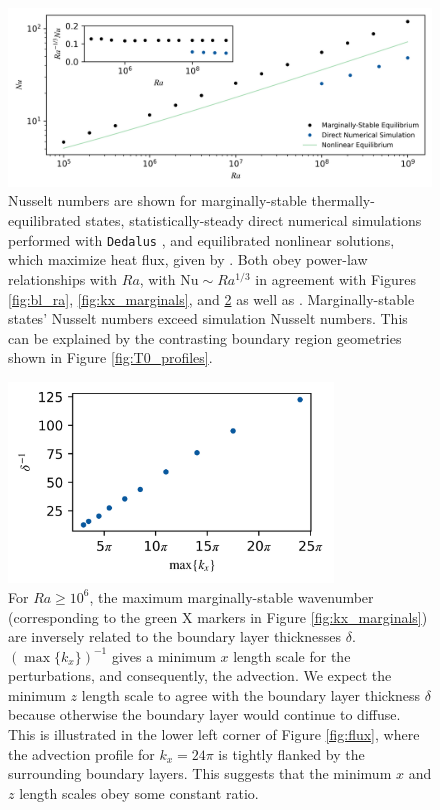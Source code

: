 \documentclass[reprint,amsmath,amssymb,aps]{revtex4-1}
\newcommand\Nu{\mathrm{Nu}}
\begin{document}
\begin{figure}
    \centering
    \includegraphics[width=7.1in]{nu_ra.PNG}
    \caption{Nusselt numbers are shown for marginally-stable thermally-equilibrated states, statistically-steady direct numerical simulations performed with \texttt{Dedalus} \cite{Anders_cd}, and equilibrated nonlinear solutions, which maximize heat flux, given by \cite{Waleffe}. 
    Both obey power-law relationships with $Ra$, with $\Nu \sim Ra^{1/3}$ in agreement with Figures \ref{fig:bl_ra}, \ref{fig:kx_marginals}, and \ref{fig:del_inv} as well as \cite{Malkus_1954}. 
    Marginally-stable states' Nusselt numbers exceed simulation Nusselt numbers. 
    This can be explained by the contrasting boundary region geometries shown in Figure \ref{fig:T0_profiles}.}%
    \label{fig:nu_vs_ra}%
\end{figure}

\begin{figure}
    \centering
    \includegraphics[width=3.4in]{del_kx_inv.png}
    \caption{For $Ra \geq 10^6$, the maximum marginally-stable wavenumber (corresponding to the green X markers in Figure \ref{fig:kx_marginals}) are inversely related to the boundary layer thicknesses $\delta$. 
    $(\max \{ k_x \})^{-1}$ gives a minimum $x$ length scale for the perturbations, and consequently, the advection. 
    We expect the minimum $z$ length scale to agree with the boundary layer thickness $\delta$ because otherwise the boundary layer would continue to diffuse. 
    This is illustrated in the lower left corner of Figure \ref{fig:flux}, where the advection profile for $k_x = 24\pi$ is tightly flanked by the surrounding boundary layers. 
    This suggests that the minimum $x$ and $z$ length scales obey some constant ratio.}
    \label{fig:del_inv}
\end{figure}
\end{document}

